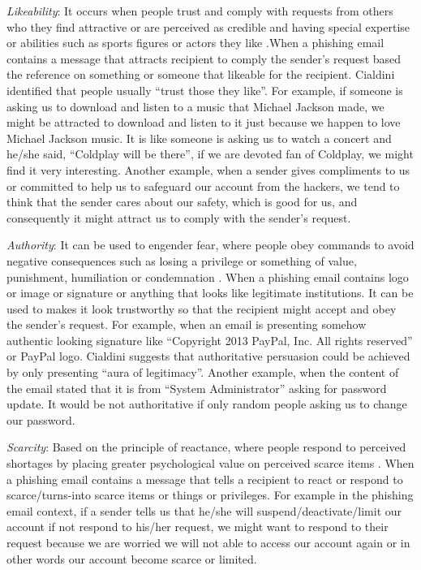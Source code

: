 \emph{Likeability}: It occurs when people trust and comply with requests
from others who they find attractive or are perceived as credible
and having special expertise or abilities such as sports figures or
actors they like \cite{workman:2008}.When a phishing email contains
a message that attracts recipient to comply the sender\textquoteright s
request based the reference on something or someone that likeable
for the recipient. Cialdini \cite{cialdini:2001} identified that
people usually \textquotedblleft trust those they like\textquotedblright .
For example, if someone is asking us to download and listen to a music
that Michael Jackson made, we might be attracted to download and listen
to it just because we happen to love Michael Jackson music. It is
like someone is asking us to watch a concert and he/she said, \textquotedblleft Coldplay
will be there\textquotedblright , if we are devoted fan of Coldplay,
we might find it very interesting. Another example, when a sender
gives compliments to us or committed to help us to safeguard our account
from the hackers, we tend to think that the sender cares about our
safety, which is good for us, and consequently it might attract us
to comply with the sender\textquoteright s request. 

\emph{Authority}: It can be used to engender fear, where people obey
commands to avoid negative consequences such as losing a privilege
or something of value, punishment, humiliation or condemnation \cite{workman:2008}.
When a phishing email contains logo or image or signature or anything
that looks like legitimate institutions. It can be used to makes it
look trustworthy so that the recipient might accept and obey the sender\textquoteright s
request. For example, when an email is presenting somehow authentic
looking signature like \textquotedblleft Copyright 2013 PayPal, Inc.
All rights reserved\textquotedblright{} or PayPal logo. Cialdini \cite{cialdini:2001}
suggests that authoritative persuasion could be achieved by only presenting
\textquotedblleft aura of legitimacy\textquotedblright . Another example,
when the content of the email stated that it is from \textquotedblleft System
Administrator\textquotedblright{} asking for password update. It would
be not authoritative if only random people asking us to change our
password. 

\emph{Scarcity}: Based on the principle of reactance, where people
respond to perceived shortages by placing greater psychological value
on perceived scarce items \cite{workman:2008}. When a phishing email
contains a message that tells a recipient to react or respond to scarce/turns-into
scarce items or things or privileges. For example in the phishing
email context, if a sender tells us that he/she will suspend/deactivate/limit
our account if not respond to his/her request, we might want to respond
to their request because we are worried we will not able to access
our account again or in other words our account become scarce or limited.

